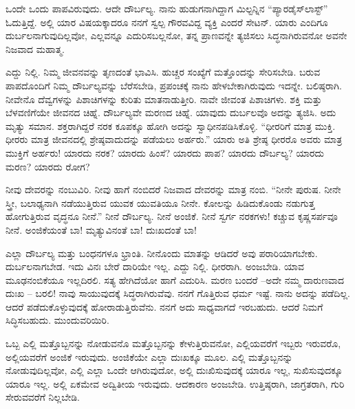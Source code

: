 ಒಂದೇ ಒಂದು ಪಾಪವಿರುವುದು. ಆದೇ ದೌರ್ಬಲ್ಯ. ನಾನು ಹುಡುಗನಾಗಿದ್ದಾಗ ಮಿಲ್ಟನ್ನಿನ “ಪ್ಯಾರಡೈಸ್​ ಲಾಸ್ಟ್​” ಓದುತ್ತಿದ್ದೆ. ಅಲ್ಲಿ ಯಾರ ವಿಷಯಕ್ಕಾದರೂ ನನಗೆ ಸ್ವಲ್ಪ ಗೌರವವಿದ್ದ ವ್ಯಕ್ತಿ ಎಂದರೆ ಸೇಟನ್​. ಯಾರು ಎಂದಿಗೂ ದುರ್ಬಲನಾಗುವುದಿಲ್ಲವೋ, ಎಲ್ಲವನ್ನೂ ಎದುರಿಸಬಲ್ಲನೋ, ತನ್ನ ಪ್ರಾಣವನ್ನೇ ತ್ಯಜಿಸಲು ಸಿದ್ಧನಾಗಿರುವನೋ ಅವನೇ ನಿಜವಾದ ಮಹಾತ್ಮ.

ಎದ್ದು ನಿಲ್ಲಿ. ನಿಮ್ಮ ಜೀವನವನ್ನು ತೃಣದಂತೆ ಭಾವಿಸಿ. ಹುಚ್ಚರ ಸಂಖ್ಯೆಗೆ ಮತ್ತೊಂದನ್ನು ಸೇರಿಸಬೇಡಿ. ಬರುವ ಪಾಪದೊಂದಿಗೆ ನಿಮ್ಮ ದೌರ್ಬಲ್ಯವನ್ನು ಬೆರೆಸಬೇಡಿ, ಪ್ರಪಂಚಕ್ಕೆ ನಾನು ಹೇಳಬೇಕಾಗಿರುವುದು ಇದನ್ನೇ. ಬಲಿಷ್ಠರಾಗಿ. ನೀವೇನೊ ದೆವ್ವಗಳನ್ನು ಪಿಶಾಚಿಗಳನ್ನು ಕುರಿತು ಮಾತನಾಡುತ್ತೀರಿ. ನಾವೇ ಜೀವಂತ ಪಿಶಾಚಿಗಳು. ಶಕ್ತಿ ಮತ್ತು ಬೆಳವಣಿಗೆಯೇ ಜೀವನದ ಚಿಹ್ನೆ. ದೌರ್ಬಲ್ಯವೇ ಮರಣದ ಚಿಹ್ನೆ. ಯಾವುದು ದುರ್ಬಲವೊ ಅದನ್ನು ತ್ಯಜಿಸಿ. ಅದು ಮೃತ್ಯು ಸಮಾನ. ಶಕ್ತರಾಗಿದ್ದರೆ ನರಕ ಕೂಪಕ್ಕೂ ಹೋಗಿ ಅದನ್ನು ಸ್ವಾಧೀನಪಡಿಸಿಕೊಳ್ಳಿ. “ಧೀರರಿಗೆ ಮಾತ್ರ ಮುಕ್ತಿ. ಧೀರರು ಮಾತ್ರ ಜೀವನದಲ್ಲಿ ಶ್ರೇಷ್ಠವಾದುದನ್ನು ಪಡೆಯಲು ಅರ್ಹರು.” ಯಾರು ಅತಿ ಶ್ರೇಷ್ಠ ಧೀರರೊ ಅವರು ಮಾತ್ರ ಮುಕ್ತಿಗೆ ಅರ್ಹರು! ಯಾರದು ನರಕ? ಯಾರದು ಹಿಂಸೆ? ಯಾರದು ಪಾಪ? ಯಾರದು ದೌರ್ಬಲ್ಯ? ಯಾರದು ಮರಣ? ಯಾರದು ರೋಗ?

ನೀವು ದೇವರನ್ನು ನಂಬುವಿರಿ. ನೀವು ಹಾಗೆ ನಂಬಿದರೆ ನಿಜವಾದ ದೇವರನ್ನು ಮಾತ್ರ ನಂಬಿ. “ನೀನೇ ಪುರುಷ. ನೀನೇ ಸ್ತ್ರೀ, ಬಲಾಢ್ಯನಾಗಿ ನಡೆಯುತ್ತಿರುವ ಯುವಕ ಯುವತಿಯೂ ನೀನೇ. ಕೋಲನ್ನು ಹಿಡಿದುಕೊಂಡು ನಡುಗುತ್ತ ಹೋಗುತ್ತಿರುವ ವೃದ್ಧನೂ ನೀನೆ.” ನೀನೆ ದೌರ್ಬಲ್ಯ. ನೀನೆ ಅಂಜಿಕೆ. ನೀನೆ ಸ್ವರ್ಗ ನರಕಗಳು! ಕಚ್ಚುವ ಕೃಷ್ಣಸರ್ಪವೂ ನೀನೆ. ಅಂಜಿಕೆಯಂತೆ ಬಾ! ಮೃತ್ಯುವಿನಂತೆ ಬಾ! ದುಃಖದಂತೆ ಬಾ!

ಎಲ್ಲಾ ದೌರ್ಬಲ್ಯ ಮತ್ತು ಬಂಧನಗಳೂ ಭ್ರಾಂತಿ. ನೀನೊಂದು ಮಾತನ್ನು ಆಡಿದರೆ ಅವು ಪರಾರಿಯಾಗಬೇಕು. ದುರ್ಬಲನಾಗಬೇಡ. ಇದು ವಿನಃ ಬೇರೆ ದಾರಿಯೇ ಇಲ್ಲ. ಎದ್ದು ನಿಲ್ಲಿ. ಧೀರರಾಗಿ. ಅಂಜಬೇಡಿ. ಯಾವ ಮೂಢನಂಬಿಕೆಯೂ ಇಲ್ಲದಿರಲಿ. ಸತ್ಯ ಹೇಗಿದೆಯೋ ಹಾಗೆ ಎದುರಿಸಿ. ಮರಣ ಬಂದರೆ –ಅದೇ ನಮ್ಮ ದಾರುಣವಾದ ದುಃಖ – ಬರಲಿ! ನಾವು ಸಾಯುವುದಕ್ಕೆ ಸಿದ್ಧರಾಗಿರುವೆವು. ನನಗೆ ಗೊತ್ತಿರುವ ಧರ್ಮ ಇಷ್ಟೆ. ನಾನು ಅದನ್ನು ಪಡೆದಿಲ್ಲ. ಆದರೆ ಪಡೆದುಕೊಳ್ಳುವುದಕ್ಕೆ ಹೋರಾಡುತ್ತಿರುವೆನು. ನನಗೆ ಅದು ಸಾಧ್ಯವಾಗದೆ ಇರಬಹುದು. ಆದರೆ ನಿಮಗೆ ಸಿದ್ಧಿಸಬಹುದು. ಮುಂದುವರಿಯಿರಿ.

ಒಬ್ಬ ಎಲ್ಲಿ ಮತ್ತೊಬ್ಬನನ್ನು ನೋಡುವನೊ ಮತ್ತೊಬ್ಬನನ್ನು ಕೇಳುತ್ತಿರುವನೋ, ಎಲ್ಲಿಯವರೆಗೆ ಇಬ್ಬರು ಇರುವರೊ, ಅಲ್ಲಿಯವರೆಗೆ ಅಂಜಿಕೆ ಇರುವುದು. ಅಂಜಿಕೆಯೇ ಎಲ್ಲಾ ದುಃಖಕ್ಕೂ ಮೂಲ. ಎಲ್ಲಿ ಮತ್ತೊಬ್ಬನನ್ನು ನೋಡುವುದಿಲ್ಲವೋ, ಎಲ್ಲಿ ಎಲ್ಲಾ ಒಂದೇ ಆಗಿರುವುದೋ, ಅಲ್ಲಿ ದುಃಖಿಸುವುದಕ್ಕೆ ಯಾರೂ ಇಲ್ಲ, ಸುಖಿಸುವುದಕ್ಕೂ ಯಾರೂ ಇಲ್ಲ. ಅಲ್ಲಿ ಏಕಮೇವ ಅದ್ವಿತೀಯ ಇರುವುದು. ಆದಕಾರಣ ಅಂಜಬೇಡಿ. ಉತ್ತಿಷ್ಠರಾಗಿ, ಜಾಗ್ರತರಾಗಿ, ಗುರಿ ಸೇರುವವರೆಗೆ ನಿಲ್ಲಬೇಡಿ.


